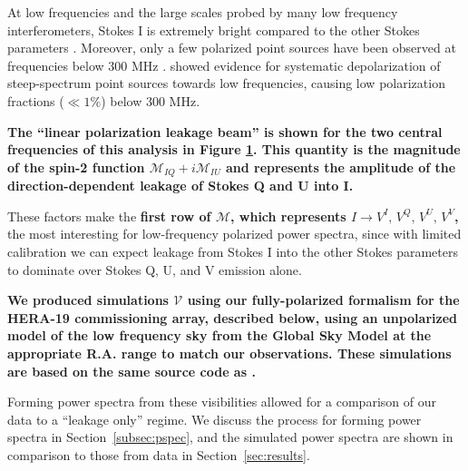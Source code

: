 \documentclass[twocolumn, trackchanges]{aastex61}
\newcommand{\edited}[1]{{\bf \color{blue} #1}}
\begin{document}
\begin{figure}
{{%
}}
\label{fig:lin_pol_beam}
\end{figure}


At low frequencies and the large scales probed by many low frequency interferometers, Stokes I is extremely bright compared to the other Stokes parameters \citep{Bernardi.09, Bernardi.10, Jelic.14, Jelic.15, Asad15, Kohn16, Lenc.17, Moore17}. Moreover, only a few polarized point sources have been observed at frequencies below 300 MHz \citep{Bernardi.13, Asad.16, Lenc.17}. \cite{Farnes.14} showed evidence for systematic depolarization of steep-spectrum point sources towards low frequencies, causing low polarization fractions ($\ll 1\%$) below 300 MHz. 

\edited{The ``linear polarization leakage beam'' is shown for the two central frequencies of this analysis in Figure \ref{fig:lin_pol_beam}.   This quantity is the magnitude of the spin-2 function $\mathcal{M}_{IQ} + i \mathcal{M}_{IU}$ and represents the amplitude of the direction-dependent leakage of Stokes Q and U into I.}

These factors make the \edited{first row of $\mathcal{M}$, which represents $I\rightarrow V^I,\,V^Q,\,V^U,\,V^V$,} the most interesting for low-frequency polarized power spectra, since with limited calibration we can expect leakage from Stokes I into the other Stokes parameters to dominate over Stokes Q, U, and V emission alone. 

\edited{We produced simulations $\mathcal{V}$ using our fully-polarized formalism for the HERA-19 commissioning array, described below, using an unpolarized model of the low frequency sky from the Global Sky Model \citep[GSM;][]{GSM.08, pygsm, GSM.17} at the appropriate R.A. range to match our observations. These simulations are based on the same source code as \citet{Martinot18}.}

Forming power spectra from these visibilities allowed for a comparison of our data to a ``leakage only'' regime. We discuss the process for forming power spectra in Section~\ref{subsec:pspec}, and the simulated power spectra are shown in comparison to those from data in Section~\ref{sec:results}.
\end{document}
